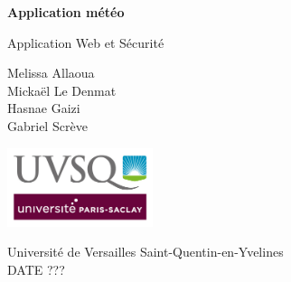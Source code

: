 \begin{titlepage}
    \begin{center}
        \vspace*{1cm}

        \Huge
        \textbf{Application météo}

        \vspace{0.4cm}
        \LARGE
        Application Web et Sécurité

        \vspace{1.6cm}

        \large
        Melissa Allaoua \\
        Mickaël Le Denmat \\
        Hasnae Gaizi \\
        Gabriel Scrève \\

        \vfill

        \vspace{0.8cm}
        \includegraphics[width=0.32\textwidth]{images/UVSQ-logo}

        \vspace{0.4cm}

        \Large
        Université de Versailles Saint-Quentin-en-Yvelines \\
        \vspace{0.4cm}
        DATE ???
    \end{center}
\end{titlepage}